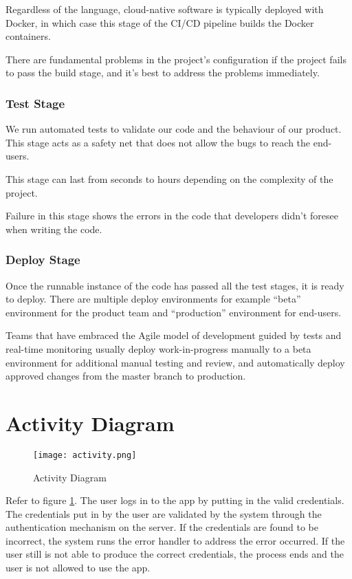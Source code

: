 Regardless of the language, cloud-native software is typically deployed with Docker, in which case this 
stage of the CI/CD pipeline builds the Docker containers.

There are fundamental problems in the project's configuration if the project fails to pass the build 
stage, and it’s best to address the problems immediately.

\subsubsection{Test Stage}
We run automated tests to validate our code and the behaviour of our product. This stage acts as a safety
net that does not allow the bugs to reach the end-users.

This stage can last from seconds to  hours depending on the complexity of the project.

Failure in this stage shows the errors in the code that developers didn't foresee when writing the code.

\subsubsection{Deploy Stage}
Once the runnable instance of the code has passed all the test stages, it is ready to deploy. There are 
multiple deploy environments for example “beta” environment for the product team and “production” 
environment for end-users.

Teams that have embraced the Agile model of development guided by tests and real-time monitoring usually 
deploy work-in-progress manually to a beta environment for additional manual testing and review, and 
automatically deploy approved changes from the master branch to production.

\section{Activity Diagram}

\begin{figure}[h!]
    \begin{center}
        \texttt{[image: activity.png]}
    \end{center}
    \caption{Activity Diagram}
    \label{fig:activity}
\end{figure}

Refer to figure \ref{fig:activity}. The user logs in to the app by putting in the valid credentials.
The credentials put in by the user are validated by the system through the authentication mechanism on the server.
If the credentials are found to be incorrect, the system runs the error handler to address the error occurred.
If the user still is not able to produce the correct credentials, the process ends and the user is not allowed to use the app.

